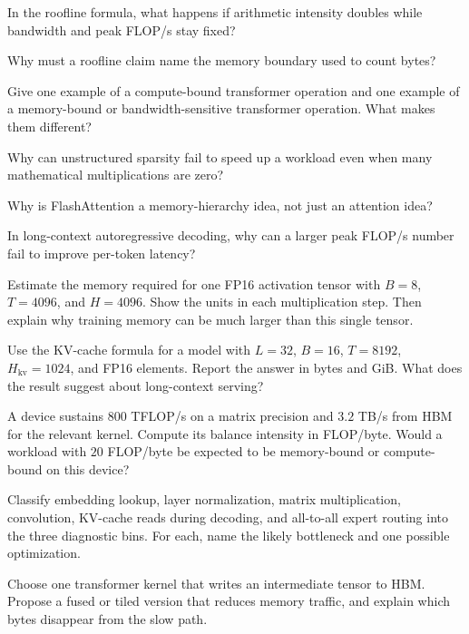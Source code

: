 \begin{conceptquestions}
\item In the roofline formula, what happens if arithmetic intensity doubles while bandwidth and peak FLOP/s stay fixed?
\item Why must a roofline claim name the memory boundary used to count bytes?
\item Give one example of a compute-bound transformer operation and one example of a memory-bound or bandwidth-sensitive transformer operation. What makes them different?
\item Why can unstructured sparsity fail to speed up a workload even when many mathematical multiplications are zero?
\item Why is FlashAttention a memory-hierarchy idea, not just an attention idea?
\item In long-context autoregressive decoding, why can a larger peak FLOP/s number fail to improve per-token latency?
\end{conceptquestions}

\begin{exercises}
\item Estimate the memory required for one FP16 activation tensor with \(B=8\), \(T=4096\), and \(H=4096\). Show the units in each multiplication step. Then explain why training memory can be much larger than this single tensor.
\item Use the KV-cache formula for a model with \(L=32\), \(B=16\), \(T=8192\), \(H_{\text{kv}}=1024\), and FP16 elements. Report the answer in bytes and GiB. What does the result suggest about long-context serving?
\item A device sustains \(800\) TFLOP/s on a matrix precision and \(3.2\) TB/s from HBM for the relevant kernel. Compute its balance intensity in FLOP/byte. Would a workload with \(20\) FLOP/byte be expected to be memory-bound or compute-bound on this device?
\item Classify embedding lookup, layer normalization, matrix multiplication, convolution, KV-cache reads during decoding, and all-to-all expert routing into the three diagnostic bins. For each, name the likely bottleneck and one possible optimization.
\item Choose one transformer kernel that writes an intermediate tensor to HBM. Propose a fused or tiled version that reduces memory traffic, and explain which bytes disappear from the slow path.
\end{exercises}
